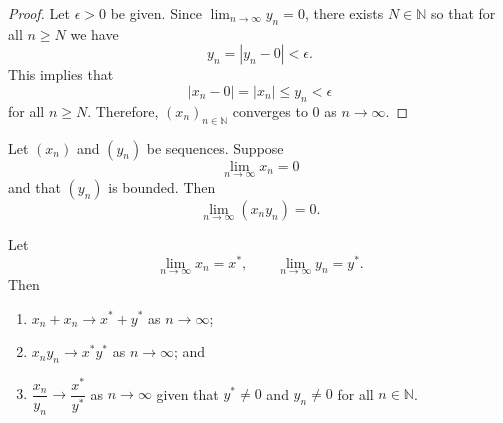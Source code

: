 \begin{proof}
    Let $\epsilon>0$ be given. Since $\lim_{n\to\infty}{y_n}=0$, there exists $N\in\mathbb N$ so that for all $n\geq N$ we have \[y_n=|y_n-0|<\epsilon.\] This implies that \[|x_n-0|=|x_n|\leq y_n<\epsilon\] for all $n\geq N$. Therefore, $(x_n)_{n\in\mathbb N}$ converges to $0$ as $n\to\infty$.
\end{proof}

\begin{theorem}
    Let $(x_n)$ and $(y_n)$ be sequences. Suppose \[\lim_{n\to\infty}x_n=0\] and that $(y_n)$ is bounded. Then \[\lim_{n\to\infty}(x_ny_n)=0.\]
\end{theorem}


\begin{theorem}
    Let \[\lim_{n\to\infty}x_n=x^*,\qquad\lim_{n\to\infty}y_n=y^*.\] Then
    \begin{enumerate}
        \item $x_n+x_n\to x^*+y^*$ as $n\to\infty$;
        \item $x_ny_n\to x^*y^*$ as $n\to\infty$; and
        \item $\dfrac{x_n}{y_n}\to\dfrac{x^*}{y^*}$ as $n\to\infty$ given that $y^*\neq 0$ and $y_n\neq0$ for all $n\in\mathbb N$.
    \end{enumerate}
\end{theorem}

